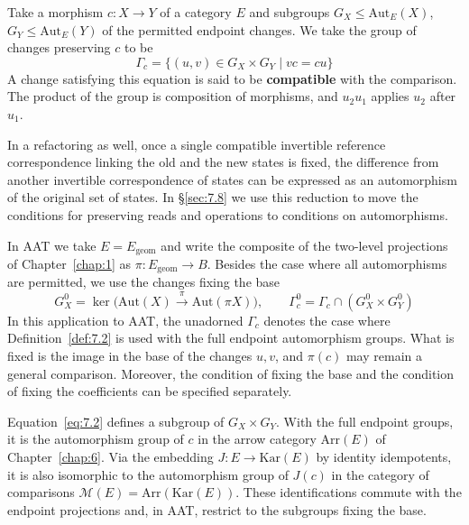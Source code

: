 \begin{definition}\label{def:7.2}

Take a morphism $c:X\to Y$ of a category $E$ and subgroups
$G_X\le\mathrm{Aut}_E(X)$, $G_Y\le\mathrm{Aut}_E(Y)$ of the permitted endpoint changes.
We take the group of changes preserving $c$ to be
\begin{equation*}
\Gamma_c=\{(u,v)\in G_X\times G_Y\mid vc=cu\}
\tag{7.2}\label{eq:7.2}
\end{equation*}
A change satisfying this equation is said to be \textbf{compatible} with the comparison.
The product of the group is composition of morphisms, and $u_2u_1$ applies $u_2$ after
$u_1$.

In a refactoring as well, once a single compatible invertible reference correspondence
linking the old and the new states is fixed, the difference from another invertible
correspondence of states can be expressed as an automorphism of the original set of states.
In \S\ref{sec:7.8} we use this reduction to move the conditions for preserving reads and
operations to conditions on automorphisms.

In AAT we take $E=E_{\mathrm{geom}}$ and write the composite of the two-level projections of
Chapter~\ref{chap:1} as $\pi:E_{\mathrm{geom}}\to B$.
Besides the case where all automorphisms are permitted, we use the changes fixing the base
\begin{equation*}
G_X^0=\ker\bigl(\mathrm{Aut}(X)\xrightarrow{\pi}
\mathrm{Aut}(\pi X)\bigr),\qquad
\Gamma_c^0=\Gamma_c\cap(G_X^0\times G_Y^0)
\tag{7.3}\label{eq:7.3}
\end{equation*}
In this application to AAT, the unadorned $\Gamma_c$ denotes the case where Definition~\ref{def:7.2} is used
with the full endpoint automorphism groups.
What is fixed is the image in the base of the changes $u,v$, and $\pi(c)$ may remain a
general comparison.
Moreover, the condition of fixing the base and the condition of fixing the coefficients can
be specified separately.

\end{definition}

\begin{proposition}\label{prop:7.3}

Equation~\eqref{eq:7.2} defines a subgroup of $G_X\times G_Y$.
With the full endpoint groups, it is the automorphism group of $c$ in the arrow
category $\mathrm{Arr}(E)$ of Chapter~\ref{chap:6}.
Via the embedding $J:E\to\mathrm{Kar}(E)$ by identity idempotents, it is also
isomorphic to the automorphism group of $J(c)$ in the category of comparisons
$\mathcal{M}(E)=\mathrm{Arr}(\mathrm{Kar}(E))$.
These identifications commute with the endpoint projections and, in AAT, restrict
to the subgroups fixing the base.

\end{proposition}

